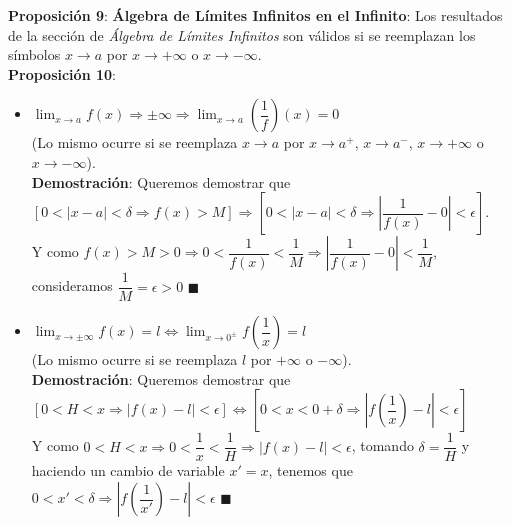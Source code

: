 \documentclass[11pt,a4paper]{article}
\newcommand*{\QEDA}{\null\nobreak\hfill\ensuremath{\blacksquare}}
\begin{document}
\noindent \textbf{Proposici\'on 9}: \textbf{\'Algebra de L\'imites Infinitos en el Infinito}: Los resultados de la secci\'on de \textit{\'Algebra de L\'imites Infinitos} son v\'alidos si se reemplazan los s\'imbolos $x\to a$ por $x\to +\infty$ o $x\to -\infty$.\\


\noindent \textbf{Proposici\'on 10}:
\begin{itemize}
\item $\displaystyle{\lim_{x \to a} f(x) \Rightarrow \pm\infty} \Rightarrow \displaystyle{\lim_{x \to a} \left(\dfrac{1}{f}\right)(x) = 0}$ \\ (Lo mismo ocurre si se reemplaza $x\to a$ por $x\to a^+$, $x\to a^-$, $x\to +\infty$ o $x\to -\infty$).\\
\textbf{Demostraci\'on}: Queremos demostrar que\\ $\left[0<|x-a|<\delta \Rightarrow f(x) > M \right] \Rightarrow \left[0<|x-a|<\delta \Rightarrow \left|\dfrac{1}{f(x)}-0\right|<\epsilon\right]$. \\
Y como $f(x)>M>0 \Rightarrow 0 <\dfrac{1}{f(x)}<\dfrac{1}{M} \Rightarrow \left|\dfrac{1}{f(x)}-0\right| < \dfrac{1}{M}$, consideramos $\dfrac{1}{M} = \epsilon > 0$ \QEDA\\

\item $\displaystyle{\lim_{x \to \pm\infty} f(x) = l} \iff \displaystyle{\lim_{x \to 0^\pm} f\left(\dfrac{1}{x}\right) = l}$ \\ (Lo mismo ocurre si se reemplaza $l$ por $+\infty$ o $-\infty$).\\
\textbf{Demostraci\'on}: Queremos demostrar que\\ $\left[ 0<H<x \Rightarrow |f(x)-l| < \epsilon \right] \iff \left[ 0 < x < 0 + \delta  \Rightarrow \left|f\left(\dfrac{1}{x}\right)-l\right| < \epsilon \right]$\\
Y como $0<H<x \Rightarrow 0<\dfrac{1}{x} < \dfrac{1}{H} \Rightarrow |f(x)-l|<\epsilon$, tomando $\delta = \dfrac{1}{H}$ y haciendo un cambio de variable $x'=x$, tenemos que $0< x' < \delta \Rightarrow \left|f\left(\dfrac{1}{x'}\right)-l\right|<\epsilon$ \QEDA

\end{itemize}
\end{document}
